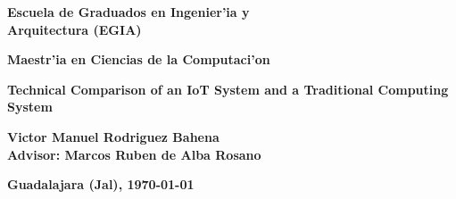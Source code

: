 \begin{center}
\Large
\textbf{Escuela de Graduados en Ingenier'ia y\\ Arquitectura (EGIA)}\\
\vspace{20 pt}

\textbf{Maestr'ia en Ciencias de la Computaci'on}\\
\vspace{42 pt}

\Huge
\textbf{Technical Comparison of an IoT System and a Traditional Computing
System}\\
\vspace{40 pt}

\Large
\begin{flushleft}
\hspace{5pt}\textbf{Victor Manuel Rodriguez Bahena}\\
\vspace{5pt}
\hspace{5pt}\textbf{Advisor: Marcos Ruben de Alba Rosano} \\
\end{flushleft}

\large
\vspace{10pt}
\textbf{Guadalajara (Jal), \today }
\end{center}
\clearpage

\renewcommand{\baselinestretch}{1.5}
